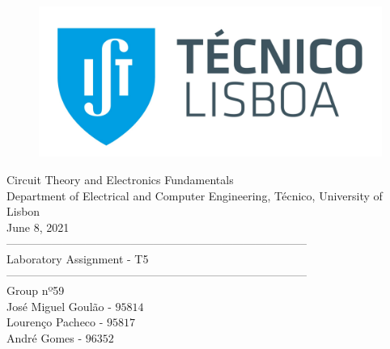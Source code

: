 
\thispagestyle {empty}


\begin{figure}[ht]
	\centering
	\includegraphics[width = 0.5\linewidth]{ist_foto}
\end{figure}


\begin{center}

	\vspace{2cm}
	{\FontLb Circuit Theory and Electronics Fundamentals} \\

	\vspace{0.5cm}
	{\FontSn Department of Electrical and Computer Engineering, Técnico, University of Lisbon} \\

	\vspace{0.5cm}
	{\FontSn June 8, 2021} \\

	\vspace{1cm}
	{\FontLb --------------------------------------------------------------------------------} \\
	\vspace{0.1cm}
	{\FontLb Laboratory Assignment - T5} \\
	{\FontLb --------------------------------------------------------------------------------} \\

	\vspace{1cm}
	{\FontMb Group nº59} \\
	\vspace{0.25cm}
	{\FontSn José Miguel Goulão - $95814$} \\
	{\FontSn Lourenço Pacheco - $95817$} \\
	{\FontSn André Gomes - $96352$} \\

	\vspace{.5cm}

\end{center}

